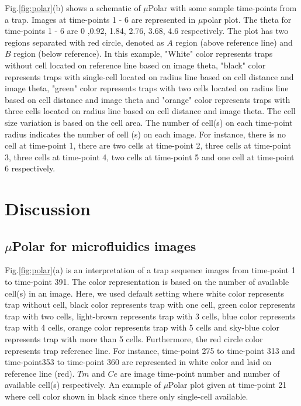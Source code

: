 \documentclass[conference]{IEEEtran}
\begin{document}
Fig.\ref{fig:polar}(b) shows a schematic of $\mu$Polar with some sample time-points from a trap. Images at time-points 1 - 6 are represented in $\mu$polar plot. The theta for time-points 1 - 6 are 0 ,0.92, 1.84, 2.76, 3.68, 4.6 respectively. The plot has two regions separated with red circle, denoted as $ A $ region (above reference line) and $ B $ region (below reference). In this example, "White" color represents traps without cell located on reference line based on image theta, "black" color represents traps with single-cell located on radius line based on cell distance and image theta, "green" color represents traps with two cells located on radius line based on cell distance and image theta and "orange" color represents traps with three cells located on radius line based on cell distance and image theta. The cell size variation is based on the cell area. The number of cell(s) on each time-point radius indicates the number of cell (s) on each image. For instance, there is no cell at time-point 1, there are two cells at time-point 2, three cells at time-point 3, three cells at time-point 4, two cells at time-point 5 and one cell at time-point 6 respectively.

 
\section{Discussion}

\subsection{$\mu$Polar for microfluidics images}

Fig.\ref{fig:polar}(a) is an interpretation of a trap sequence images from time-point 1 to time-point 391. The color representation is based on the number of available cell(s) in an image. Here, we used default setting where white color represents trap without cell, black color represents trap with one cell, green color represents trap with two cells, light-brown represents trap with 3 cells, blue color represents trap with 4 cells, orange color represents trap with 5 cells and sky-blue color represents trap with more than 5 cells. Furthermore, the red circle color represents trap reference line. For instance, time-point 275 to time-point 313 and time-point353 to time-point 360 are represented in white color and laid on reference line (red). $ Tm  $ and  $ Ce $  are image time-point number and number of available cell(s) respectively. An example of $\mu$Polar plot given at time-point 21 where cell color shown in black since there only single-cell available. 
\end{document}
